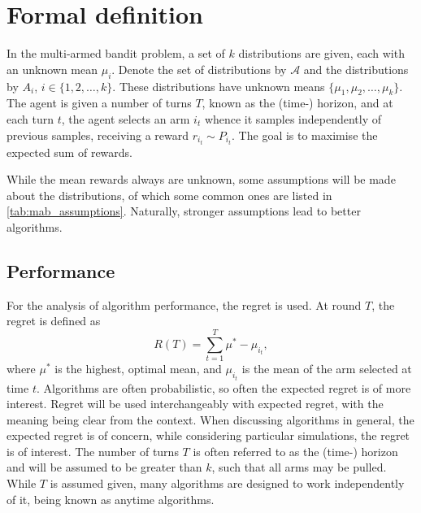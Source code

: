 \section{Formal definition}
In the multi-armed bandit problem, a set of $k$ distributions are given, each with an unknown mean $\mu_i$.
Denote the set of distributions by $\mathcal{A}$ and the distributions by $A_i$, $i \in \{1,2,\dots,k\}$.
These distributions have unknown means $\{\mu_1, \mu_2,\dots,\mu_k\}$.
The agent is given a number of turns $T$, known as the (time-) horizon, and at each turn $t$, the agent selects an arm $i_t$ whence it samples independently of previous samples, receiving a reward $r_{i_t} \sim P_{i_t}$.
The goal is to maximise the expected sum of rewards.

While the mean rewards always are unknown, some assumptions will be made about the distributions, of which some common ones are listed in \cref{tab:mab_assumptions}.
Naturally, stronger assumptions lead to better algorithms.


\subsection{Performance}
For the analysis of algorithm performance, the regret is used.
At round $T$, the regret is defined as
\begin{equation}
    R(T) = \sum_{t=1}^T \mu^* - \mu_{i_t},
\end{equation}
where $\mu^*$ is the highest, optimal mean, and $\mu_{i_t}$ is the mean of the arm selected at time $t$.
Algorithms are often probabilistic, so often the expected regret is of more interest.
Regret will be used interchangeably with expected regret, with the meaning being clear from the context.
When discussing algorithms in general, the expected regret is of concern, while considering particular simulations, the regret is of interest.
The number of turns $T$ is often referred to as the (time-) horizon and will be assumed to be greater than $k$, such that all arms may be pulled.
While $T$ is assumed given, many algorithms are designed to work independently of it, being known as anytime algorithms.

